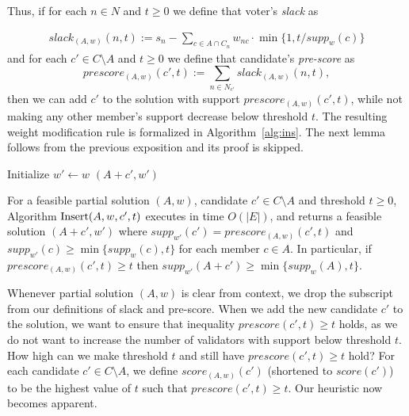 Thus, if for each $n\in N$ and $t\geq 0$ we define that voter's \emph{slack} as

\begin{align}
    slack_{(A,w)}(n,t):= s_n - \sum_{c\in A\cap C_n} w_{nc} \cdot\min \Big\{ 1, t/supp_w(c)\Big\} \label{eq:slack}
\end{align}
%
and for each $c'\in C\setminus A$ and $t\geq 0$ we define that candidate's \emph{pre-score} as
%
\begin{equation}\label{eq:prescore}
    prescore_{(A,w)}(c',t) := \sum_{n\in N_{c'}} slack_{(A,w)}(n,t),
\end{equation}
%
then we can add $c'$ to the solution with support $prescore_{(A,w)}(c',t)$, while not making any other member's support decrease below threshold $t$. The resulting weight modification rule is formalized in Algorithm~\ref{alg:ins}. The next lemma follows from the previous exposition and its proof is skipped.

\begin{algorithm}[htb]\label{alg:ins}
\SetAlgoLined
{}
Initialize $w'\leftarrow w$\;
\Return $(A+c',w')$\;
 \caption{$\ins(A,w,c',t)$}
\end{algorithm}

\begin{lemma}\label{lem:insert}
For a feasible partial solution $(A,w)$, candidate $c'\in C\setminus A$ and threshold $t\geq 0$, 
Algorithm $\ins(A,w,c',t)$ executes in time $O(|E|)$, and returns a feasible solution $(A+c',w')$ 
where $supp_{w'}(c')=prescore_{(A,w)}(c',t)$ and $supp_{w'}(c)\geq \min\{supp_w(c),t\}$ for each member $c\in A$. 
In particular, if $prescore_{(A,w)}(c',t)\geq t$ then $supp_{w'}(A+c')\geq \min\{supp_w(A),t\}$.
\end{lemma}

Whenever partial solution $(A,w)$ is clear from context, we drop the subscript from our definitions of slack and pre-score. 
When we add the new candidate $c'$ to the solution, we want to ensure that inequality $prescore(c',t)\geq t$ holds, as we do not want to increase the number of validators with support below threshold $t$. How high can we make threshold $t$ and still have $prescore(c',t)\geq t$ hold? For each candidate $c'\in C\setminus A$, we define $score_{(A,w)}(c')$ (shortened to $score(c')$) to be the highest value of $t$ such that $prescore(c',t) \geq t$. Our heuristic now becomes apparent.

